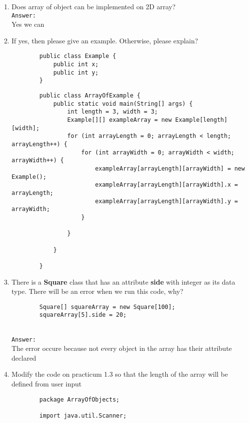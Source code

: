 \documentclass[12pt,titlepage]{article}
\begin{document}
\begin{enumerate}
    \item Does array of object can be implemented on 2D array?
    \mbox{}\\ \texttt{Answer:}
    \mbox{}\\ Yes we can
    \item If yes, then please give an example. Otherwise, please explain?
    \begin{verbatim}
        public class Example {
            public int x;
            public int y;
        }
    \end{verbatim}
    \begin{verbatim}
        public class ArrayOfExample {
            public static void main(String[] args) {
                int length = 3, width = 3;
                Example[][] exampleArray = new Example[length][width];
                for (int arrayLength = 0; arrayLength < length; arrayLength++) {
                    for (int arrayWidth = 0; arrayWidth < width; arrayWidth++) {
                        exampleArray[arrayLength][arrayWidth] = new Example();
                        exampleArray[arrayLength][arrayWidth].x = arrayLength;
                        exampleArray[arrayLength][arrayWidth].y = arrayWidth;
                    }

                }

            }

        }
    \end{verbatim}
    \item There is a \textbf{Square} class that has an attribute \textbf{side} with integer as its data type. There will be an error when we run this code, why?
    \begin{verbatim}
        Square[] squareArray = new Square[100];
        squareArray[5].side = 20;
    \end{verbatim}
    \mbox{}\\ \texttt{Answer:}
    \mbox{}\\ The error occure because not every object in the array has their attribute declared 
    \item Modify the code on practicum 1.3 so that the length of the array will be defined from user input
    \begin{verbatim}
        package ArrayOfObjects;

        import java.util.Scanner;


\end{verbatim}
\end{enumerate}
\end{document}
